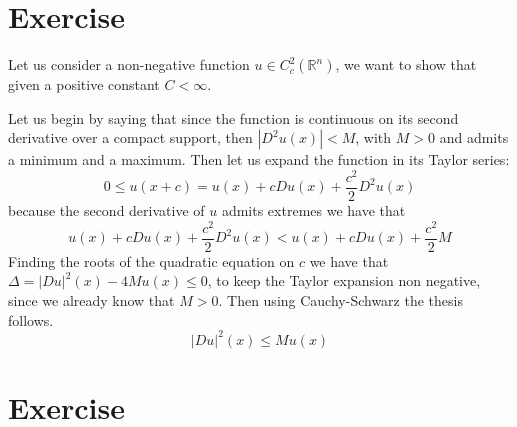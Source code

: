 \documentclass{article}
\begin{document}
\section{Exercise}
Let us consider a non-negative function $u\in C^2_c(\mathbb R^n)$, we want to show that given a positive constant $C<\infty$.

Let us begin by saying that since the function is continuous on its second derivative over a compact support, then $|D^2 u(x)|<M$, with $M>0$ and admits a minimum and a maximum.
Then let us expand the function in its Taylor series:
\[
    0\leq u(x+c) = u(x) +c Du(x) + \frac{c^2}{2} D^2u(x)
\]
because the second derivative of $u$ admits extremes we have that
\[
    u(x) +c Du(x) + \frac{c^2}{2} D^2u(x) < u(x) +c Du(x) + \frac{c^2}{2} M
\]
Finding the roots of the quadratic equation on $c$ we have that $\Delta = |Du|^2 (x)- 4M u(x) \leq 0$, to keep the Taylor expansion non negative, since we already know that $M>0$.
Then using Cauchy-Schwarz the thesis follows.
\[
    |Du|^2 (x) \leq M u(x)
\]
\section{Exercise}
\end{document}
